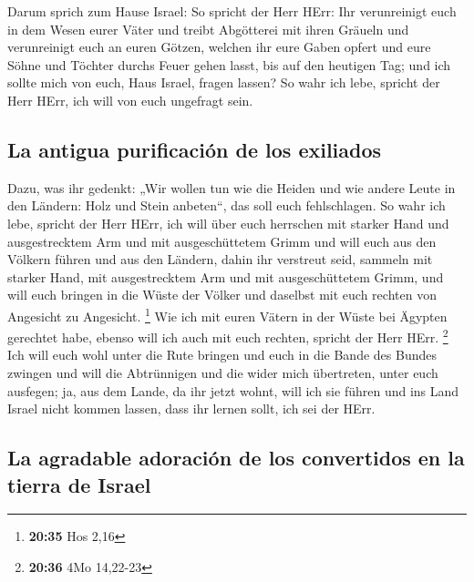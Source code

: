  Darum sprich zum Hause Israel: So spricht der Herr HErr:
Ihr verunreinigt euch in dem Wesen eurer Väter und treibt Abgötterei mit
ihren Gräueln  und verunreinigt euch an euren Götzen,
welchen ihr eure Gaben opfert und eure Söhne und Töchter durchs Feuer
gehen lasst, bis auf den heutigen Tag; und ich sollte mich von euch,
Haus Israel, fragen lassen? So wahr ich lebe, spricht der Herr HErr, ich
will von euch ungefragt sein.

\hypertarget{la-antigua-purificaciuxf3n-de-los-exiliados}{%
\subsection{La antigua purificación de los
exiliados}\label{la-antigua-purificaciuxf3n-de-los-exiliados}}

 Dazu, was ihr gedenkt: „Wir wollen tun wie die Heiden
und wie andere Leute in den Ländern: Holz und Stein anbeten``, das soll
euch fehlschlagen.  So wahr ich lebe, spricht der Herr
HErr, ich will über euch herrschen mit starker Hand und ausgestrecktem
Arm und mit ausgeschüttetem Grimm  und will euch aus den
Völkern führen und aus den Ländern, dahin ihr verstreut seid, sammeln
mit starker Hand, mit ausgestrecktem Arm und mit ausgeschüttetem Grimm,
 und will euch bringen in die Wüste der Völker und
daselbst mit euch rechten von Angesicht zu Angesicht. \footnote{\textbf{20:35}
  Hos 2,16}  Wie ich mit euren Vätern in der Wüste bei
Ägypten gerechtet habe, ebenso will ich auch mit euch rechten, spricht
der Herr HErr. \footnote{\textbf{20:36} 4Mo 14,22-23} 
Ich will euch wohl unter die Rute bringen und euch in die Bande des
Bundes zwingen  und will die Abtrünnigen und die wider
mich übertreten, unter euch ausfegen; ja, aus dem Lande, da ihr jetzt
wohnt, will ich sie führen und ins Land Israel nicht kommen lassen, dass
ihr lernen sollt, ich sei der HErr.

\hypertarget{la-agradable-adoraciuxf3n-de-los-convertidos-en-la-tierra-de-israel}{%
\subsection{La agradable adoración de los convertidos en la tierra de
Israel}\label{la-agradable-adoraciuxf3n-de-los-convertidos-en-la-tierra-de-israel}}

